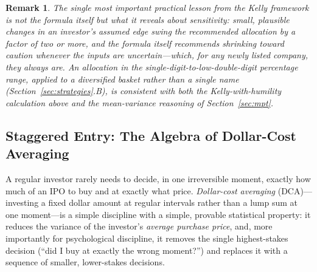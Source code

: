 \documentclass[conference]{IEEEtran}
\newtheorem{remark}{Remark}
\begin{document}
\begin{remark}
The single most important practical lesson from the Kelly framework is not the formula itself but what it reveals about \emph{sensitivity}: small, plausible changes in an investor's assumed edge swing the recommended allocation by a factor of two or more, and the formula itself recommends shrinking toward caution whenever the inputs are uncertain---which, for any newly listed company, they always are. An allocation in the single-digit-to-low-double-digit percentage range, applied to a \emph{diversified basket} rather than a single name (Section~\ref{sec:strategies}.B), is consistent with both the Kelly-with-humility calculation above and the mean-variance reasoning of Section~\ref{sec:mpt}.
\end{remark}

\subsection{Staggered Entry: The Algebra of Dollar-Cost Averaging}

A regular investor rarely needs to decide, in one irreversible moment, exactly how much of an IPO to buy and at exactly what price. \emph{Dollar-cost averaging} (DCA)---investing a fixed dollar amount at regular intervals rather than a lump sum at one moment---is a simple discipline with a simple, provable statistical property: it reduces the variance of the investor's \emph{average purchase price}, and, more importantly for psychological discipline, it removes the single highest-stakes decision (``did I buy at exactly the wrong moment?'') and replaces it with a sequence of smaller, lower-stakes decisions.
\end{document}
